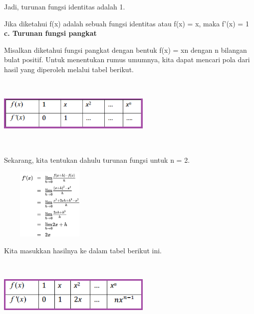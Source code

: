 \documentclass[11pt,fleqn]{book} %
\begin{document}
\noindent 
Jadi, turunan fungsi identitas adalah 1.

\noindent 
Jika diketahui f(x) adalah sebuah fungsi identitas atau f(x) = x, maka f'(x) = 1\\

\noindent 
\noindent \textbf{c. Turunan fungsi pangkat}

\noindent 
Misalkan diketahui fungsi pangkat dengan bentuk f(x) = xn dengan n bilangan bulat positif. Untuk menentukan rumus umumnya, kita dapat mencari pola dari hasil yang diperoleh melalui tabel berikut.

\noindent 
\begin{center}
\includegraphics*[width=2.90in, height=1.35in]{Pictures/TurunanFungsi9.png}
\end{center}

\noindent 
Sekarang, kita tentukan dahulu turunan fungsi untuk n = 2.

\noindent 
\begin{center}
\includegraphics*[width=1.90in, height=1.35in]{Pictures/TurunanFungsi10.png}
\end{center}

\noindent 
Kita masukkan hasilnya ke dalam tabel berikut ini.

\noindent 
\begin{center}
\includegraphics*[width=2.90in, height=1.35in]{Pictures/TurunanFungsi11.png}
\end{center}
\end{document}
